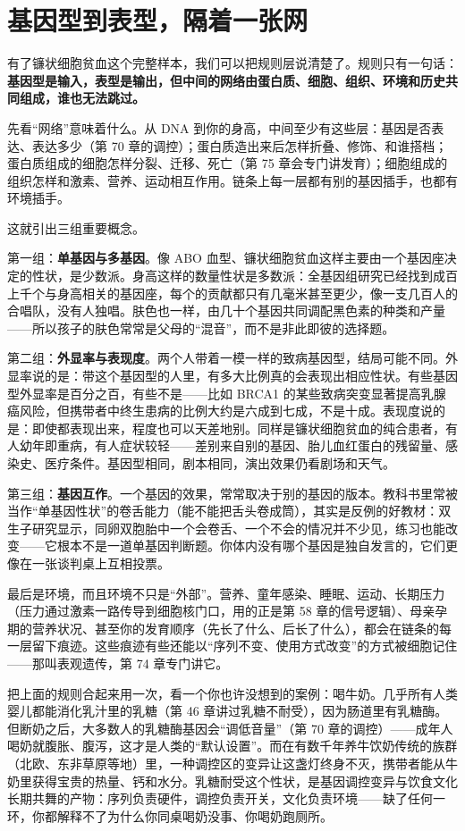 \section{基因型到表型，隔着一张网}

有了镰状细胞贫血这个完整样本，我们可以把规则层说清楚了。规则只有一句话：\textbf{基因型是输入，表型是输出，但中间的网络由蛋白质、细胞、组织、环境和历史共同组成，谁也无法跳过。}

先看“网络”意味着什么。从 DNA 到你的身高，中间至少有这些层：基因是否表达、表达多少（第 70 章的调控）；蛋白质造出来后怎样折叠、修饰、和谁搭档；蛋白质组成的细胞怎样分裂、迁移、死亡（第 75 章会专门讲发育）；细胞组成的组织怎样和激素、营养、运动相互作用。链条上每一层都有别的基因插手，也都有环境插手。

这就引出三组重要概念。

第一组：\textbf{单基因与多基因}。像 ABO 血型、镰状细胞贫血这样主要由一个基因座决定的性状，是少数派。身高这样的数量性状是多数派：全基因组研究已经找到成百上千个与身高相关的基因座，每个的贡献都只有几毫米甚至更少，像一支几百人的合唱队，没有人独唱。肤色也一样，由几十个基因共同调配黑色素的种类和产量——所以孩子的肤色常常是父母的“混音”，而不是非此即彼的选择题。

第二组：\textbf{外显率与表现度}。两个人带着一模一样的致病基因型，结局可能不同。外显率说的是：带这个基因型的人里，有多大比例真的会表现出相应性状。有些基因型外显率是百分之百，有些不是——比如 BRCA1 的某些致病突变显著提高乳腺癌风险，但携带者中终生患病的比例大约是六成到七成，不是十成。表现度说的是：即使都表现出来，程度也可以天差地别。同样是镰状细胞贫血的纯合患者，有人幼年即重病，有人症状较轻——差别来自别的基因、胎儿血红蛋白的残留量、感染史、医疗条件。基因型相同，剧本相同，演出效果仍看剧场和天气。

第三组：\textbf{基因互作}。一个基因的效果，常常取决于别的基因的版本。教科书里常被当作“单基因性状”的卷舌能力（能不能把舌头卷成筒），其实是反例的好教材：双生子研究显示，同卵双胞胎中一个会卷舌、一个不会的情况并不少见，练习也能改变——它根本不是一道单基因判断题。你体内没有哪个基因是独自发言的，它们更像在一张谈判桌上互相投票。

最后是环境，而且环境不只是“外部”。营养、童年感染、睡眠、运动、长期压力（压力通过激素一路传导到细胞核门口，用的正是第 58 章的信号逻辑）、母亲孕期的营养状况、甚至你的发育顺序（先长了什么、后长了什么），都会在链条的每一层留下痕迹。这些痕迹有些还能以“序列不变、使用方式改变”的方式被细胞记住——那叫表观遗传，第 74 章专门讲它。

把上面的规则合起来用一次，看一个你也许没想到的案例：喝牛奶。几乎所有人类婴儿都能消化乳汁里的乳糖（第 46 章讲过乳糖不耐受），因为肠道里有乳糖酶。但断奶之后，大多数人的乳糖酶基因会“调低音量”（第 70 章的调控）——成年人喝奶就腹胀、腹泻，这才是人类的“默认设置”。而在有数千年养牛饮奶传统的族群（北欧、东非草原等地）里，一种调控区的变异让这盏灯终身不灭，携带者能从牛奶里获得宝贵的热量、钙和水分。乳糖耐受这个性状，是基因调控变异与饮食文化长期共舞的产物：序列负责硬件，调控负责开关，文化负责环境——缺了任何一环，你都解释不了为什么你同桌喝奶没事、你喝奶跑厕所。

